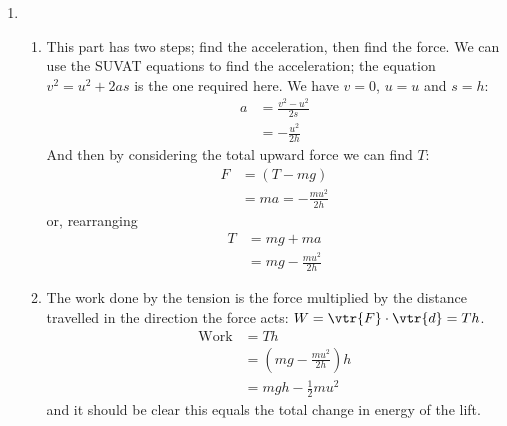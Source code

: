 \begin{problem}[HE+_Lift]
{\begin{enumerate}
\begin{enumerate}
or, rearranging \begin{align*} T &= mg - ma \\ &= mg + \frac{mu^{2}}{2h} \end{align*}
	\item The work done by the tension is the force multiplied by the distance travelled in the direction the force acts: $W = \vtr{F}\cdot\vtr{d} = -Th$ (as the tension acts in the opposite direction to the distance).
	\begin{align*} \textrm{Work} &= -Th \\&= -\left(mg + \frac{mu^{2}}{2h}\right)h \\ &= - mgh - \frac{1}{2}mu^{2} \end{align*}
and it should be clear this equals the total change in energy of the lift.
\end{enumerate}
\item 
\begin{enumerate} 
\item This part has two steps; find the acceleration, then find the force. We can use the SUVAT equations to find the acceleration; the equation $v^{2} = u^{2} + 2as$ is the one required here. We have $v = 0$, $u = u$ and $s = h$:
\begin{align*} a &= \frac{v^{2} - u^{2}}{2s} \\ &= -\frac{u^{2}}{2h} \end{align*}
And then by considering the total upward force we can find $T$:
\begin{align*} F &= (T - mg) \\ &= ma = -\frac{mu^{2}}{2h} \end{align*}
or, rearranging \begin{align*} T &= mg + ma \\ &= mg - \frac{mu^{2}}{2h} \end{align*}
	\item The work done by the tension is the force multiplied by the distance travelled in the direction the force acts: $W = \vtr{F}\cdot\vtr{d} = Th$.
	\begin{align*} \textrm{Work} &= Th \\&= \left(mg - \frac{mu^{2}}{2h}\right)h \\ &= mgh - \frac{1}{2}mu^{2} \end{align*}
and it should be clear this equals the total change in energy of the lift. 
\end{enumerate}
\end{enumerate}}
\end{problem}